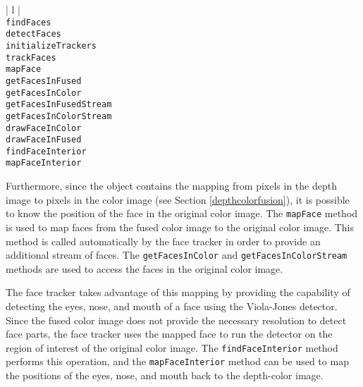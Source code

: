 \begin{table}[ht]
\caption{Public methods in the \FaceTracker{} class}
\begin{center}
\begin{tabular}{| l |}
	\hline 
	 \\
	\hline \hline
	\texttt{findFaces} \\
	\texttt{detectFaces} \\
	\texttt{initializeTrackers} \\
	\texttt{trackFaces} \\
	\texttt{mapFace} \\
	\texttt{getFacesInFused} \\
	\texttt{getFacesInColor} \\
	\texttt{getFacesInFusedStream} \\
	\texttt{getFacesInColorStream} \\
	\texttt{drawFaceInColor} \\
	\texttt{drawFaceInFused} \\
	\texttt{findFaceInterior} \\
	\texttt{mapFaceInterior} \\
	\hline
\end{tabular}
\end{center}
\label{facetrackermethods}
\end{table}

Furthermore, since the \DepthColorFusion{} object contains the mapping from pixels in the depth image to 
pixels in the color image (see Section \ref{depthcolorfusion}), it is possible to know the position of the face in 
the original color image. The \texttt{map\-Face} method is used to map faces from the fused color image to the 
original color image. This method is called automatically by the face tracker in order to provide an additional 
stream of faces. The \texttt{get\-Fac\-es\-In\-Col\-or} and \texttt{get\-Fac\-es\-In\-Col\-or\-Stream} methods
are used to access the faces in the original color image. 

The face tracker takes advantage of this mapping by providing the capability of detecting the 
eyes, nose, and mouth of a face using the Viola-Jones detector. Since the fused color image does not provide 
the necessary resolution to detect face parts, the face tracker uses the mapped face to run the detector 
on the region of interest of the original color image. The \texttt{find\-Face\-In\-te\-ri\-or} method performs this 
operation, and the \texttt{map\-Face\-In\-te\-ri\-or} method can be used to map the positions of the eyes, nose, 
and mouth back to the depth-color image.

